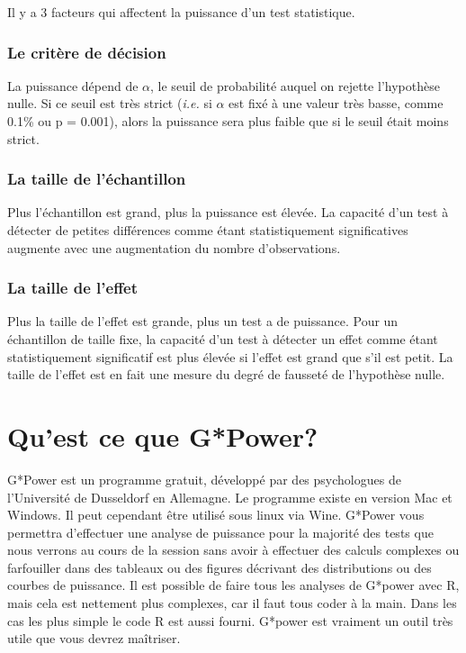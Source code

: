 \documentclass[12pt,]{book}
\begin{document}
Il y a 3 facteurs qui affectent la puissance d'un test statistique.

\hypertarget{le-crituxe8re-de-duxe9cision}{%
\subsubsection*{Le critère de décision}\label{le-crituxe8re-de-duxe9cision}}

La puissance dépend de \(\alpha\), le seuil de probabilité auquel on rejette l'hypothèse nulle.
Si ce seuil est très strict (\emph{i.e.} si \(\alpha\) est fixé à une valeur très basse, comme 0.1\% ou p = 0.001), alors la puissance sera plus faible que si le seuil était moins strict.

\hypertarget{la-taille-de-luxe9chantillon}{%
\subsubsection*{La taille de l'échantillon}\label{la-taille-de-luxe9chantillon}}

Plus l'échantillon est grand, plus la puissance est élevée.
La capacité d'un test à détecter de petites différences comme étant statistiquement significatives augmente avec une augmentation du nombre d'observations.

\hypertarget{la-taille-de-leffet}{%
\subsubsection*{La taille de l'effet}\label{la-taille-de-leffet}}

Plus la taille de l'effet est grande, plus un test a de puissance.
Pour un échantillon de taille fixe, la capacité d'un test à détecter un effet comme étant statistiquement significatif est plus élevée si l'effet est grand que s'il est petit.
La taille de l'effet est en fait une mesure du degré de fausseté de l'hypothèse nulle.

\hypertarget{quest-ce-que-gpower}{%
\section{Qu'est ce que G*Power?}\label{quest-ce-que-gpower}}

G*Power est un programme gratuit, développé par des psychologues de l'Université de Dusseldorf en Allemagne.
Le programme existe en version Mac et Windows.
Il peut cependant être utilisé sous linux via Wine.
G*Power vous permettra d'effectuer une analyse de puissance pour la majorité des tests que nous verrons au cours de la session sans avoir à effectuer des calculs complexes ou farfouiller dans des tableaux ou des figures décrivant des distributions ou des courbes de puissance.
Il est possible de faire tous les analyses de G*power avec R, mais cela est nettement plus complexes, car il faut tous coder à la main. Dans les cas les plus simple le code R est aussi fourni.
G*power est vraiment un outil très utile que vous devrez maîtriser.
\end{document}
